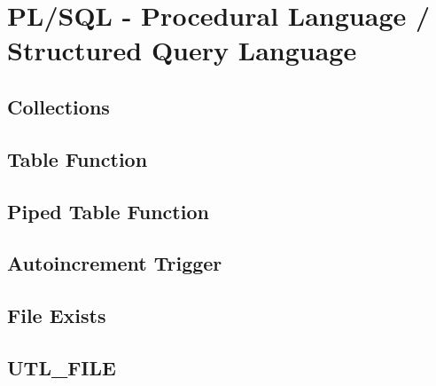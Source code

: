 \section[PLSQL]{PL/SQL - Procedural Language / Structured Query Language}
\label{sec:plsql}

\subsection{Collections}
\label{sec:plsql.collections}

\subsection{Table Function}
\label{sec:plsql.table_function}

\subsection{Piped Table Function}
\label{sec:plsql.piped_table_function}

\subsection{Autoincrement Trigger}
\label{sec:plsql.autoincrement_trigger}

\subsection{File Exists}
\label{sec:plsql.file_exists}

\subsection{UTL\_FILE}
\label{sec:plsql.utl_file}
